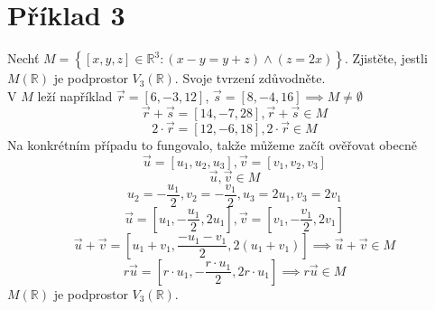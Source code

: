 \section*{Příklad 3}
Nechť $M = \left\{[x, y, z] \in \mathbb{R}^3: (x - y = y + z) \wedge (z = 2x)\right\}$.
Zjistěte, jestli $ M(\mathbb{R})$ je podprostor $ V_3(\mathbb{R})$.
Svoje tvrzení zdůvodněte.\\
V $M$ leží například $\vec{r} = [6,-3,12]$, $\vec{s} = [8,-4,16] \implies M \neq \emptyset$
$$ \vec{r} + \vec{s} = [14,-7,28], \vec{r} + \vec{s} \in M $$
$$ 2 \cdot \vec{r} = [12, -6, 18], 2 \cdot \vec{r} \in M $$
Na konkrétním případu to fungovalo, takže můžeme začít ověřovat obecně \\
$$ \vec{u} = [u_1,u_2,u_3], \vec{v} = [v_1,v_2,v_3] $$
$$ \vec{u}, \vec{v} \in M $$
$$ u_2 = -\frac{u_1}{2}, v_2 = -\frac{v_1}{2}, u_3 = 2u_1, v_3 = 2v_1 $$
$$
\vec{u} = \left[u_1, -\frac{u_1}{2}, 2u_1 \right],
\vec{v} = \left[v_1, -\frac{v_1}{2}, 2v_1 \right]
$$
$$
\vec{u} + \vec{v} = \left[u_1 + v_1, \frac{-u_1-v_1}{2}, 2(u_1 + v_1) \right]
\implies \vec{u} + \vec{v} \in M
$$
$$
r \vec{u} = \left[r \cdot u_1, -\frac{r \cdot u_1}{2}, 2r\cdot u_1 \right]
\implies r \vec{u} \in M
$$
$ M(\mathbb{R})$ je podprostor $ V_3(\mathbb{R})$.